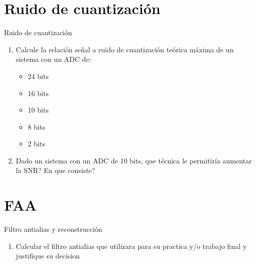  \section{Ruido de cuantización}
 \begin{frame}{Ruido de cuantización}
    \begin{enumerate}
       \item{Calcule la relación señal a ruido de cuantización teórica máxima de un sistema con un ADC de:}
          \begin{itemize}
             \item{24 bits}
             \item{16 bits}
             \item{10 bits}
             \item{ 8 bits}
             \item{ 2 bits}
          \end{itemize}
       \item{Dado un sistema con un ADC de 10 bits, que técnica le permitiría aumentar la SNR? En que consiste?}
    \end{enumerate}
    \vfill
 \end{frame}
 \section{FAA}
 \begin{frame}{Filtro antialias y reconstrucción}
    \begin{enumerate}
       \item{Calcular el filtro antialias que utilizara para su practica y/o trabajo final y justifique su decision}
    \end{enumerate}
    \vfill
 \end{frame}
